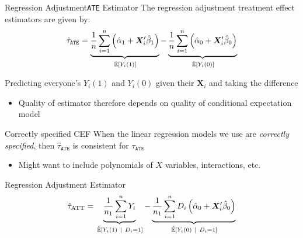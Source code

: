 \documentclass[aspectratio=169,t,11pt,table]{beamer}
\begin{document}
\begin{frame}{Regression Adjustment}{\texttt{ATE} Estimator}
  The \alert{regression adjustment treatment effect estimators} are given by:
  $$
    \hat{\tau}_{\texttt{ATE}} = 
    \underbrace{
      \frac{1}{n} \sum_{i=1}^n \left( \hat{\alpha}_1 + \bm{X}_i' \hat{\beta}_1 \right)
    }_{\expechat{Y_i(1)}} -
    \underbrace{
      \frac{1}{n} \sum_{i=1}^n \left( \hat{\alpha}_0 + \bm{X}_i' \hat{\beta}_0 \right)
    }_{\expechat{Y_i(0)}} 
  $$
  
  \bigskip
  Predicting everyone's $Y_i(1)$ and $Y_i(0)$ given their $\bm{X}_i$ and taking the difference
  \begin{itemize}
    \item Quality of estimator therefore depends on quality of conditional expectation model
  \end{itemize}
\end{frame}

\begin{frame}{Correctly specified CEF}
  When the linear regression models we use are \emph{correctly specified}, then $\hat{\tau}_{\texttt{ATE}}$ is consistent for $\tau_{\texttt{ATE}}$

  \begin{itemize}
    \item Might want to include polynomials of $X$ variables, interactions, etc.
  \end{itemize}
\end{frame}

\begin{frame}{Regression Adjustment}{ Estimator}
  $$
    \hat{\tau}_{\text{ATT}} = 
    \underbrace{
      \frac{1}{n_1} \sum_{i=1}^n Y_i
    }_{\expechat{Y_i(1)}{D_i = 1}} - 
    \underbrace{
      \frac{1}{n_1} \sum_{i=1}^n D_i \left( \hat{\alpha}_0 + \bm{X}_i' \hat{\beta}_0 \right)
    }_{\expechat{Y_i(0)}{D_i = 1}} 
  $$
\end{frame}

%   
\end{document}
